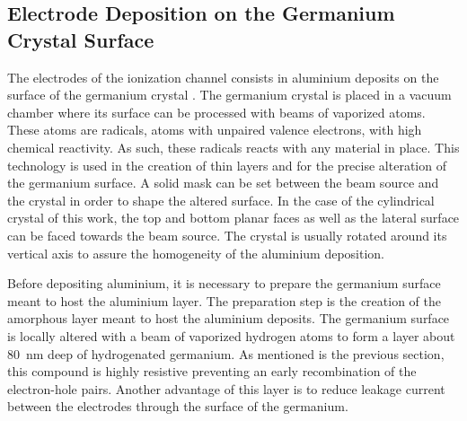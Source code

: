 

\subsection{Electrode Deposition on the Germanium Crystal Surface}
\label{par:aluminium-deposition}


The electrodes of the ionization channel consists in aluminium deposits on the surface of the germanium crystal \cite{HDRStefanos}. The germanium crystal is placed in a vacuum chamber where its surface can be processed with beams of vaporized atoms. These atoms are radicals, atoms with unpaired valence electrons, with high chemical reactivity. As such, these radicals reacts with any material in place. This technology is used in the creation of thin layers and for the precise alteration of the germanium surface. A solid mask can be set between the beam source and the crystal in order to shape the altered surface. In the case of the cylindrical crystal of this work, the top and bottom planar faces as well as the lateral surface can be faced towards the beam source. The crystal is usually rotated around its vertical axis to assure the homogeneity of the aluminium deposition. 

Before depositing aluminium, it is necessary to prepare the germanium surface meant to host the aluminium layer. The preparation step is the creation of the amorphous layer meant to host the aluminium deposits. The germanium surface is locally altered with a beam of vaporized hydrogen atoms to form a layer about \SI{80}{\nm} deep of hydrogenated germanium. As mentioned is the previous section, this compound is highly resistive preventing an early recombination of the electron-hole pairs. Another advantage of this layer is to reduce leakage current between the electrodes through the surface of the germanium.

